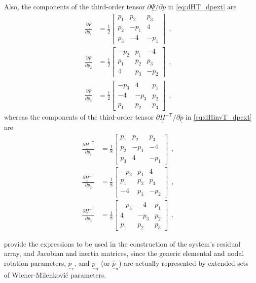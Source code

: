 \documentclass[12pt,a4paper,oneside,english]{abntex2} %
\newcommand{\vect}[1]{\underline{#1}}
\newcommand{\del}[2]{\frac{\partial#1}{\partial#2}}
\def\tens#1{\underline{\underline{#1}}}
\def\T{\mathsf{T}}
\def\H{\tens{H}}
\def\HinvT{\H^{-\T}}
\def\p{\vect{p}}
\def\phat{\widehat{\p}}
\def\pe{\p_e}
\def\pscaled{\mathring{\p}}
\begin{document}
\begin{apendicesenv}
Also, the components of the third-order tensor $\partial\tens{\Psi}/\partial\pscaled$ in \cref{eq:dHT_dpext} are
\begin{align}
    \del{\tens{\Psi}}{p_1} &= 
    \frac{1}{2}\begin{bmatrix}
    p_1 & p_2 & p_3
    \\ 
    p_2 & -p_1 & 4
    \\ 
    p_3 & -4 & -p_1
    \end{bmatrix} \ \ ,
    \label{eq:dPsi_dp1}
    \\
    \del{\tens{\Psi}}{p_2} &= 
    \frac{1}{2}\begin{bmatrix}
    -p_2 & p_1 & -4
    \\ 
    p_1 & p_2 & p_3
    \\ 
    4 & p_3 & -p_2
    \end{bmatrix} \ \ ,
    \label{eq:dPsi_dp2}
    \\
    \del{\tens{\Psi}}{p_3} &= 
    \frac{1}{2}\begin{bmatrix}
    -p_3 & 4 & p_1
    \\ 
    -4 & -p_3 & p_2
    \\ 
    p_1 & p_2 & p_3
    \end{bmatrix} \ \ ,
    \label{eq:dPsi_dp3}
\end{align}
whereas the components of the third-order tensor $\partial\HinvT/\partial\pscaled$ in \cref{eq:dHinvT_dpext} are
\begin{align}
    \del{\HinvT}{p_1} &= 
    \frac{1}{8}\begin{bmatrix}
    p_1 & p_2 & p_3
    \\ 
    p_2 & -p_1 & -4
    \\ 
    p_3 & 4 & -p_1
    \end{bmatrix} \ \ ,
    \label{eq:dHinvT_dp1}
    \\
    \del{\HinvT}{p_2} &= 
    \frac{1}{8}\begin{bmatrix}
    -p_2 & p_1 & 4
    \\ 
    p_1 & p_2 & p_3
    \\ 
    -4 & p_3 & -p_2
    \end{bmatrix} \ \ ,
    \label{eq:dHinvT_dp2}
    \\
    \del{\HinvT}{p_3} &= 
    \frac{1}{8}\begin{bmatrix}
    -p_3 & -4 & p_1
    \\ 
    4 & -p_3 & p_2
    \\ 
    p_1 & p_2 & p_3
    \end{bmatrix} \ \ .
    \label{eq:dHinvT_dp3}
\end{align}

 provide the expressions to be used in the construction of the system's residual array, and Jacobian and inertia matrices, since the generic elemental and nodal rotation parameters, $\pe$, and $\p_n$ (or $\phat_n$) are actually represented by extended sets of Wiener-Milenkovi\'{c} parameters.


\end{apendicesenv}



\end{document}
